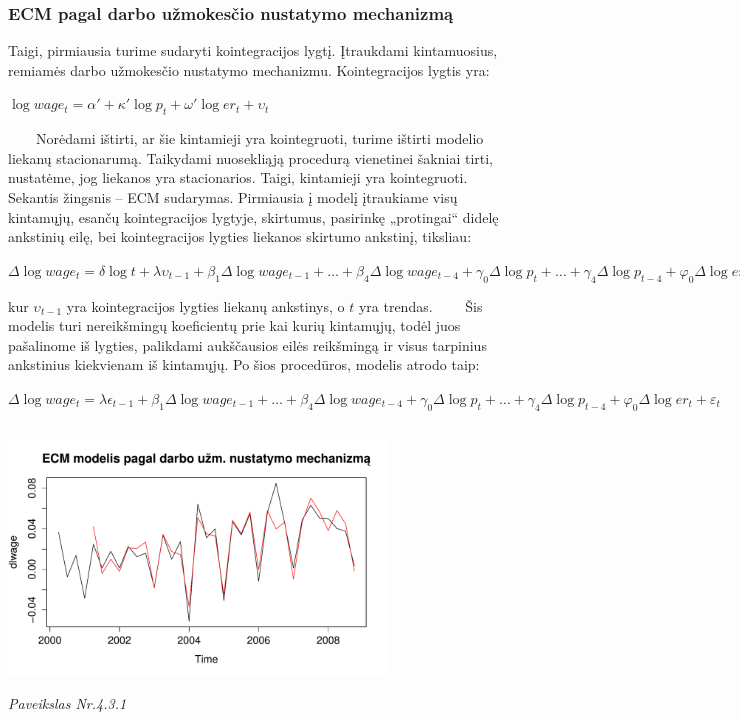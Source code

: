 \documentclass[12pt,a4paper]{article}
\theoremstyle{change}\newtheorem{salyga}{Uždavinys}
\begin{document}
\subsubsection{ECM pagal darbo užmokesčio nustatymo mechanizmą}
\hspace{40pt} Taigi, pirmiausia turime sudaryti kointegracijos lygtį. Įtraukdami kintamuosius, remiamės darbo užmokesčio nustatymo mechanizmu. Kointegracijos lygtis yra:
\vskip 8pt      
\begin{center}
\large$ \log wage_t=\alpha' + \kappa'\log p_t + \omega'\log er_t+\upsilon_t $ 
\end{center}    
\vskip 8pt      
$\qquad$Norėdami ištirti, ar šie kintamieji yra kointegruoti, turime ištirti modelio liekanų stacionarumą. Taikydami nuosekliąją procedurą vienetinei šakniai tirti, nustatėme, jog liekanos yra stacionarios. Taigi, kintamieji yra kointegruoti.
\vskip 8pt 
$\qquad$Sekantis žingsnis – ECM sudarymas. Pirmiausia į modelį įtraukiame visų kintamųjų, esančų kointegracijos lygtyje, skirtumus, pasirinkę „protingai“ didelę ankstinių eilę, bei kointegracijos lygties liekanos skirtumo ankstinį, tiksliau:
\vskip 8pt      
\begin{center}
\large$ \Delta \log wage_t = \delta\log t + \lambda \upsilon_{t-1} + \beta_1\Delta \log wage_{t-1}+ \ldots + \beta_4\Delta \log wage_{t-4}+\gamma_0 \Delta \log p_{t}+\ldots +\gamma_4 \Delta \log p_{t-4}+\varphi_0 \Delta \log er_{t}+\ldots +\varphi_4 \Delta \log er_{t-4}+\varepsilon_t$  
\end{center}
kur $ \upsilon_{t-1} $ yra kointegracijos lygties liekanų ankstinys, o $ t $ yra trendas.
\vskip 8pt   
$\qquad$Šis modelis turi nereikšmingų koeficientų prie kai kurių kintamųjų, todėl juos pašalinome iš lygties, palikdami aukščausios eilės reikšmingą ir visus tarpinius ankstinius kiekvienam iš kintamųjų. Po šios procedūros, modelis atrodo taip:     
\vskip 8pt      
\begin{center}
\large$ \Delta \log wage_t =  \lambda \epsilon_{t-1} + \beta_1\Delta \log wage_{t-1}+ \ldots + \beta_4\Delta \log wage_{t-4}+\gamma_0 \Delta \log p_{t}+\ldots +\gamma_4 \Delta \log p_{t-4}+\varphi_0 \Delta \log er_{t}+\varepsilon_t$  
\end{center}

 \begin{center}
\includegraphics[width=100mm,height=70mm]{ecm12}
\\ \textit{Paveikslas Nr.4.3.1}
\end{center}    
     
\end{document}
